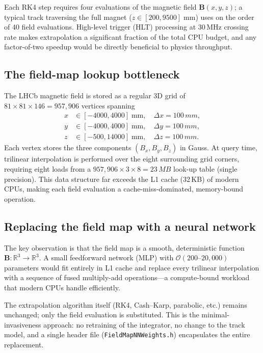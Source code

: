 \documentclass[11pt,a4paper]{article}
\newcommand{\SI}[2]{#1\,#2}
\begin{document}
Each RK4 step requires four evaluations of the magnetic field
$\mathbf{B}(x,y,z)$; a typical track traversing the full magnet
($z \in [200, 9500]\;\text{mm}$) uses on the order of
40 field evaluations.  High-level trigger (HLT) processing at
\SI{30}{MHz} crossing rate makes extrapolation a significant fraction
of the total CPU budget, and any factor-of-two speedup would be
directly beneficial to physics throughput.

\subsection{The field-map lookup bottleneck}

The LHCb magnetic field is stored as a regular 3D grid of
$81 \times 81 \times 146 = 957{,}906$ vertices spanning
\begin{align}
    x &\in [-4000, 4000] \;\text{mm}, \quad \Delta x = \SI{100}{mm}, \nonumber \\
    y &\in [-4000, 4000] \;\text{mm}, \quad \Delta y = \SI{100}{mm}, \\
    z &\in [-500, 14000]  \;\text{mm}, \quad \Delta z = \SI{100}{mm}. \nonumber
\end{align}
Each vertex stores the three components $(B_x, B_y, B_z)$ in Gauss.
At query time, trilinear interpolation is performed over the eight
surrounding grid corners, requiring eight loads from a
$957{,}906 \times 3 \times 8 = \SI{23}{MB}$ look-up table (single
precision).  This data structure far exceeds the L1 cache
(\SI{32}{KB}) of modern CPUs, making each field evaluation a
cache-miss-dominated, memory-bound operation.

\subsection{Replacing the field map with a neural network}

The key observation is that the field map is a smooth, deterministic
function $\mathbf{B}: \mathbb{R}^3 \to \mathbb{R}^3$.  A small
feedforward network (MLP) with $\mathcal{O}(200\text{--}20{,}000)$
parameters would fit entirely in L1 cache and replace every trilinear
interpolation with a sequence of fused multiply-add operations---a
compute-bound workload that modern CPUs handle efficiently.

The extrapolation algorithm itself (RK4, Cash--Karp, parabolic, etc.)
remains unchanged; only the field evaluation is substituted.  This is
the minimal-invasiveness approach: no retraining of the integrator, no
change to the track model, and a single header file
(\texttt{FieldMapNNWeights.h}) encapsulates the entire replacement.
\end{document}
